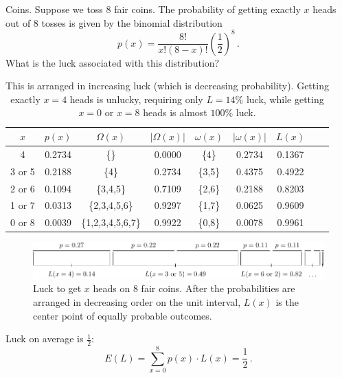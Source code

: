\begin{example}{Coins.}
Suppose we toss 8 fair coins.  The probability of getting exactly $x$ heads out of 8 tosses is given by the binomial distribution
\begin{equation}
p(x)=\frac{8!}{x!(8-x)!}\left(\frac{1}{2}\right)^8 \,.
\end{equation}
What is the luck associated with this distribution?
\begin{table}
\caption{This is arranged in increasing luck (which is decreasing probability). Getting exactly $x=4$ heads is unlucky, requiring only $L=14\%$ luck, while getting $x=0$ or $x=8$ heads is almost $100\%$ luck.}
\begin{tabular}{|c|S[table-format=2.4]|c|S[table-format=2.4]|c|S[table-format=2.4]|c|S[table-format=2.4]|S[table-format=2.4]|}
 &
 &
 &
 &
 &
 &
 \\
 & 0.2734 &  \{\} & 0.0000 & \{4\} & 0.2734 & 0.1367 \\
3 or 5 & 0.2188 & \{4\} & 0.2734 & \{3,5\} & 0.4375 & 0.4922 \\
2 or 6 & 0.1094 & \{3,4,5\} & 0.7109 & \{2,6\} & 0.2188 & 0.8203 \\
1 or 7 & 0.0313 & \{2,3,4,5,6\} & 0.9297 & \{1,7\} & 0.0625 & 0.9609 \\
0 or 8 & 0.0039 & \{1,2,3,4,5,6,7\} & 0.9922 & \{0,8\} & 0.0078 & 0.9961 \\
\hline
\end{tabular}
\end{table}
\begin{figure}
\begin{center}
\includegraphics[width=1.00\linewidth]{graphics/arrange.pdf}
\end{center}
\caption{\label{fig:arrange}Luck to get $x$ heads on $8$ fair coins.  After the probabilities are arranged in decreasing order on the unit interval, $L(x)$ is the center point of equally probable outcomes.}
\label{fig:arrange}
\end{figure}

Luck on average is $\frac{1}{2}$:
\begin{equation}
E(L)=\sum_{x=0}^8 p(x) \cdot L(x) = \frac{1}{2} \,.
\end{equation}


\end{example}
